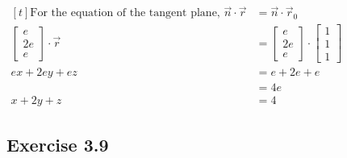 \documentclass[11pt,fleqn]{book} %
\begin{document}
$\begin{aligned}[t]
    \text{For the equation of the tangent plane, }
    \vec{n} \cdot \vec{r}
     & = \vec{n} \cdot \vec{r}_0                                                                    \\
    \begin{bmatrix} e \\ 2e \\ e \end{bmatrix} \cdot \vec{r}
     & = \begin{bmatrix} e \\ 2e \\ e \end{bmatrix} \cdot \begin{bmatrix} 1 \\ 1 \\ 1 \end{bmatrix} \\
    ex + 2ey + ez
     & = e + 2e + e                                                                                 \\
     & = 4e                                                                                         \\
    x + 2y + z
     & = 4
\end{aligned}$

\subsection*{Exercise 3.9}
\end{document}
